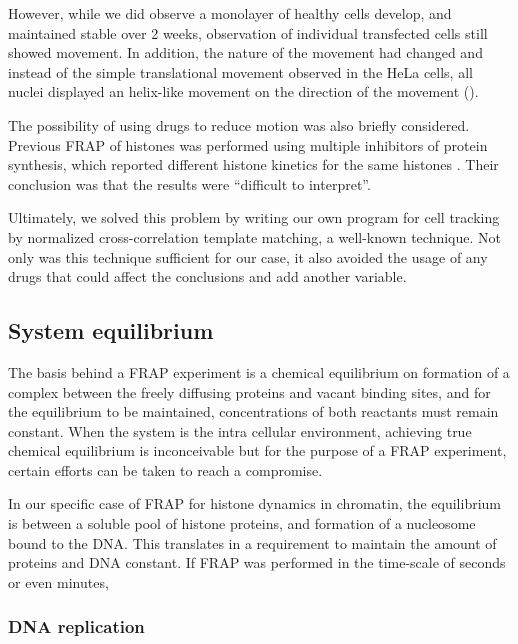    However, while we did observe a monolayer of healthy cells develop,
    and maintained stable over 2 weeks, observation of individual transfected
    cells still showed movement. In addition, the nature of the movement
    had changed and instead of the simple translational movement observed
    in the HeLa cells, all nuclei displayed an helix-like movement on the
    direction of the movement ().

    The possibility of using drugs to reduce motion was also briefly
    considered. Previous FRAP of histones was performed using
    multiple inhibitors of protein synthesis, which reported different
    histone kinetics for the same histones \citep{KimuraCook}. Their
    conclusion was that the results were ``difficult to interpret''.

    Ultimately, we solved this problem by writing our own program
    for cell tracking by normalized cross-correlation template matching, a
    well-known technique. Not only was this technique sufficient for our
    case, it also avoided the usage of any drugs that could affect the
    conclusions and add another variable.


  \subsection{System equilibrium}

    The basis behind a FRAP experiment is a chemical equilibrium on
    formation of a complex between the freely diffusing proteins and
    vacant binding sites, and for the equilibrium to be maintained,
    concentrations of both reactants must remain constant.
    When the system is the intra cellular environment, achieving
    true chemical equilibrium is inconceivable but for the purpose
    of a FRAP experiment, certain efforts can be taken to reach a
    compromise.

    In our specific case of FRAP for histone
    dynamics in chromatin, the equilibrium is between
    a soluble pool of histone proteins, and formation of a nucleosome
    bound to the DNA. This translates in a requirement to maintain the
    amount of proteins and DNA constant. If FRAP was performed in the
    time-scale of seconds or even minutes,

    \subsubsection{DNA replication}

